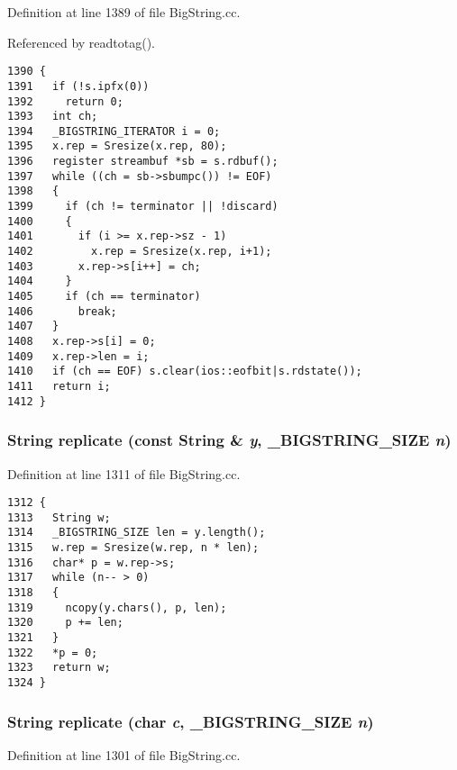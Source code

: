 Definition at line 1389 of file Big\-String.cc.

Referenced by readtotag().



\footnotesize\begin{verbatim}1390 {
1391   if (!s.ipfx(0))
1392     return 0;
1393   int ch;
1394   _BIGSTRING_ITERATOR i = 0;
1395   x.rep = Sresize(x.rep, 80);
1396   register streambuf *sb = s.rdbuf();
1397   while ((ch = sb->sbumpc()) != EOF)
1398   {
1399     if (ch != terminator || !discard)
1400     {
1401       if (i >= x.rep->sz - 1)
1402         x.rep = Sresize(x.rep, i+1);
1403       x.rep->s[i++] = ch;
1404     }
1405     if (ch == terminator)
1406       break;
1407   }
1408   x.rep->s[i] = 0;
1409   x.rep->len = i;
1410   if (ch == EOF) s.clear(ios::eofbit|s.rdstate());
1411   return i;
1412 }
\end{verbatim}\normalsize 
{}
\subsubsection{\setlength{\rightskip}{0pt plus 5cm}String replicate (const String \& {\em y}, {\bf \_\-BIGSTRING\_\-SIZE} {\em n})\hspace{0.3cm}{\tt  [friend]}}\label{classString_l42}




Definition at line 1311 of file Big\-String.cc.



\footnotesize\begin{verbatim}1312 {
1313   String w;
1314   _BIGSTRING_SIZE len = y.length();
1315   w.rep = Sresize(w.rep, n * len);
1316   char* p = w.rep->s;
1317   while (n-- > 0)
1318   {
1319     ncopy(y.chars(), p, len);
1320     p += len;
1321   }
1322   *p = 0;
1323   return w;
1324 }
\end{verbatim}\normalsize 
{}
\subsubsection{\setlength{\rightskip}{0pt plus 5cm}String replicate (char {\em c}, {\bf \_\-BIGSTRING\_\-SIZE} {\em n})\hspace{0.3cm}{\tt  [friend]}}\label{classString_l41}




Definition at line 1301 of file Big\-String.cc.



